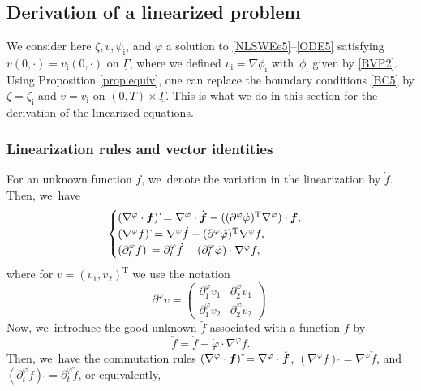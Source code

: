 \documentclass[JEP,XML,SOM,Unicode,NoFloatCountersInSection,published]{cedram}
\newcommand{\dt}{\partial_t}
\newcommand{\ul}[1]{\underline{#1}}
\newcommand{\itGamma}{\mathit{\Gamma}}
\theoremstyle{definition}
\begin{document}
\subsection{Derivation of a linearized problem}\label{subsect:DLP}
We consider here $\zeta,v,\psi_\mathrm{i}$, and $\varphi$ a solution to \eqref{NLSWEe5}--\eqref{ODE5} satisfying $v(0,\cdot)=v_\mathrm{i}(0,\cdot)$ on $\ul{\itGamma}$,
where we defined $v_\mathrm{i}=\nabla \phi_\mathrm{i}$ with~$\phi_\mathrm{i}$ given by \eqref{BVP2}.
Using Proposition \ref{prop:equiv}, one can replace the boundary conditions \eqref{BC5} by $\zeta=\zeta_\mathrm{i}$ and $v=v_\mathrm{i}$ on $(0,T)\times\ul{\itGamma}$.
This is what we do in this section for the derivation of the linearized equations.

\subsubsection{Linearization rules and vector identities}
For an unknown function $f$, we~denote the variation in the linearization by $\dot{f}$.
Then, we~have
\begin{equation}\label{linearization 1}
\begin{cases}
(\nabla^\varphi \cdot \mbox{\boldmath$f$})\,\dot{}
= \nabla^\varphi \cdot \dot{\mbox{\boldmath$f$}}
- ((\partial^\varphi \dot{\varphi})^\mathrm{T}\nabla^\varphi) \cdot \mbox{\boldmath$f$}, \\
(\nabla^\varphi f)\,\dot{}
= \nabla^\varphi \dot{f} - (\partial^\varphi \dot{\varphi})^\mathrm{T}\nabla^\varphi f, \\
(\dt^\varphi f)\,\dot{}
= \dt^\varphi\dot{f} - (\dt^\varphi\dot{\varphi}) \cdot \nabla^\varphi f,
\end{cases}
\end{equation}
where for $v = (v_1,v_2)^\mathrm{T}$ we use the notation
\[
\partial^\varphi v =
\begin{pmatrix}
\partial_1^\varphi v_1 & \partial_2^\varphi v_1 \\
\partial_1^\varphi v_2 & \partial_2^\varphi v_2
\end{pmatrix}.
\]
Now, we~introduce the good unknown $\check{f}$ associated with a function $f$ by
\begin{equation}\label{GoodUnknown}
\check{f} = \dot{f} - \dot{\varphi} \cdot \nabla^\varphi f.
\end{equation}
Then, we~have the commutation rules $(\nabla^\varphi\cdot \mbox{\boldmath$f$})\,\check{} =\nabla^\varphi\cdot \check{\mbox{\boldmath$f$}}$,
$(\nabla^\varphi f)\,\check{} =\nabla^\varphi \check{f}$, and $(\dt^\varphi f)\,\check{} =\dt^\varphi \check{f}$, or equivalently,
\end{document}
